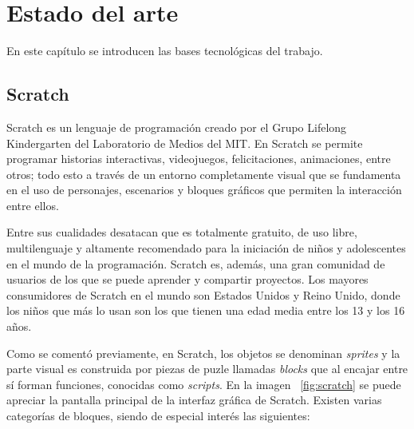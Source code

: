 \documentclass[a4paper, 12pt]{book}
\begin{document}

\cleardoublepage
\chapter{Estado del arte}
\label{chap:estado}

En este capítulo se introducen las bases tecnológicas del trabajo.

\section{Scratch}
\label{sec:Scratch}

Scratch es un lenguaje de programación creado por el Grupo Lifelong Kindergarten del Laboratorio de Medios del MIT. En Scratch se permite programar historias interactivas, videojuegos, felicitaciones, animaciones, entre otros; todo esto a través de un entorno completamente visual que se fundamenta en el uso de personajes, escenarios y bloques gráficos que permiten la interacción entre ellos.


Entre sus cualidades desatacan que es totalmente gratuito, de uso libre, multilenguaje y altamente recomendado para la iniciación de niños y adolescentes en el mundo de la programación. Scratch es, además, una gran comunidad de usuarios de los que se puede aprender y compartir proyectos. Los mayores consumidores de Scratch en el mundo son Estados Unidos y Reino Unido, donde los niños que más lo usan son los que tienen una edad media entre los 13 y los 16 años.

Como se comentó previamente, en Scratch, los objetos se denominan \textit{sprites} y la parte visual es construida por piezas de puzle llamadas \textit{blocks} que al encajar entre sí forman funciones, conocidas como \textit{scripts}. En la imagen ~\ref{fig:scratch} se puede apreciar la pantalla principal de la interfaz gráfica de Scratch. Existen varias categorías de bloques, siendo de especial interés las siguientes: 
\end{document}
